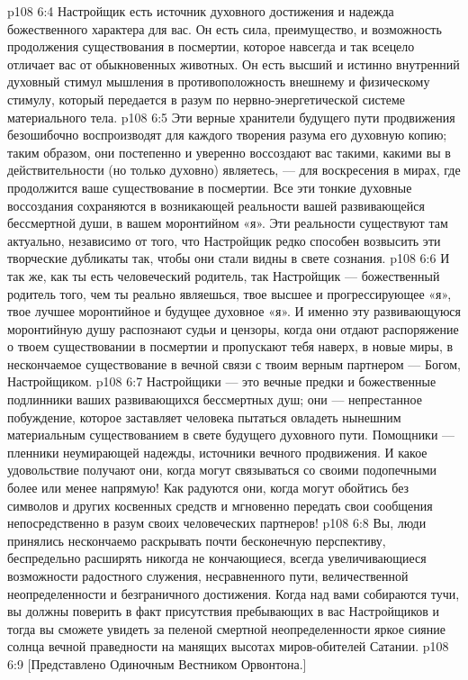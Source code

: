 \vs p108 6:4 Настройщик есть источник духовного достижения и надежда божественного характера для вас. Он есть сила, преимущество, и возможность продолжения существования в посмертии, которое навсегда и так всецело отличает вас от обыкновенных животных. Он есть высший и истинно внутренний духовный стимул мышления в противоположность внешнему и физическому стимулу, который передается в разум по нервно\hyp{}энергетической системе материального тела.
\vs p108 6:5 Эти верные хранители будущего пути продвижения безошибочно воспроизводят для каждого творения разума его духовную копию; таким образом, они постепенно и уверенно воссоздают вас такими, какими вы в действительности (но только духовно) являетесь, --- для воскресения в мирах, где продолжится ваше существование в посмертии. Все эти тонкие духовные воссоздания сохраняются в возникающей реальности вашей развивающейся бессмертной души, в вашем моронтийном «я». Эти реальности существуют там актуально, независимо от того, что Настройщик редко способен возвысить эти творческие дубликаты так, чтобы они стали видны в свете сознания.
\vs p108 6:6 \pc И так же, как ты есть человеческий родитель, так Настройщик --- божественный родитель того, чем ты реально являешься, твое высшее и прогрессирующее «я», твое лучшее моронтийное и будущее духовное «я». И именно эту развивающуюся моронтийную душу распознают судьи и цензоры, когда они отдают распоряжение о твоем существовании в посмертии и пропускают тебя наверх, в новые миры, в нескончаемое существование в вечной связи с твоим верным партнером --- Богом, Настройщиком.
\vs p108 6:7 Настройщики --- это вечные предки и божественные подлинники ваших развивающихся бессмертных душ; они --- непрестанное побуждение, которое заставляет человека пытаться овладеть нынешним материальным существованием в свете будущего духовного пути. Помощники --- пленники неумирающей надежды, источники вечного продвижения. И какое удовольствие получают они, когда могут связываться со своими подопечными более или менее напрямую! Как радуются они, когда могут обойтись без символов и других косвенных средств и мгновенно передать свои сообщения непосредственно в разум своих человеческих партнеров!
\vs p108 6:8 \pc Вы, люди принялись нескончаемо раскрывать почти бесконечную перспективу, беспредельно расширять никогда не кончающиеся, всегда увеличивающиеся возможности радостного служения, несравненного пути, величественной неопределенности и безграничного достижения. Когда над вами собираются тучи, вы должны поверить в факт присутствия пребывающих в вас Настройщиков и тогда вы сможете увидеть за пеленой смертной неопределенности яркое сияние солнца вечной праведности на манящих высотах миров\hyp{}обителей Сатании.
\vsetoff
\vs p108 6:9 [Представлено Одиночным Вестником Орвонтона.]
